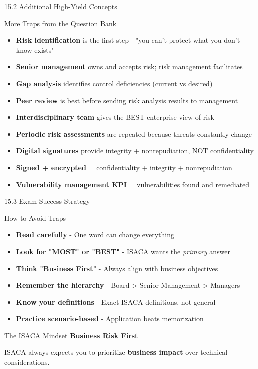 \documentclass{beamer}
\begin{document}
	\begin{frame}{15.2 Additional High-Yield Concepts}
		\begin{block}{More Traps from the Question Bank}
			\begin{itemize}
				\item \textbf{Risk identification} is the first step - "you can't protect what you don't know exists"
				\item \textbf{Senior management} owns and accepts risk; risk management facilitates
				\item \textbf{Gap analysis} identifies control deficiencies (current vs desired)
				\item \textbf{Peer review} is best before sending risk analysis results to management
				\item \textbf{Interdisciplinary team} gives the BEST enterprise view of risk
				\item \textbf{Periodic risk assessments} are repeated because threats constantly change
				\item \textbf{Digital signatures} provide integrity + nonrepudiation, NOT confidentiality
				\item \textbf{Signed + encrypted} = confidentiality + integrity + nonrepudiation
				\item \textbf{Vulnerability management KPI} = vulnerabilities found and remediated
			\end{itemize}
		\end{block}
	\end{frame}
	
	\begin{frame}{15.3 Exam Success Strategy}
		\begin{block}{How to Avoid Traps}
			\begin{itemize}
				\item \textbf{Read carefully} - One word can change everything
				\item \textbf{Look for "MOST" or "BEST"} - ISACA wants the \textit{primary} answer
				\item \textbf{Think "Business First"} - Always align with business objectives
				\item \textbf{Remember the hierarchy} - Board > Senior Management > Managers
				\item \textbf{Know your definitions} - Exact ISACA definitions, not general
				\item \textbf{Practice scenario-based} - Application beats memorization
			\end{itemize}
		\end{block}
		
		\begin{exampleblock}{The ISACA Mindset}
			\centering
			\Large{\textbf{Business Risk First}}
			
			\normalsize{ISACA always expects you to prioritize \textbf{business impact} over technical considerations.}
		\end{exampleblock}
	\end{frame}
	
\end{document}
